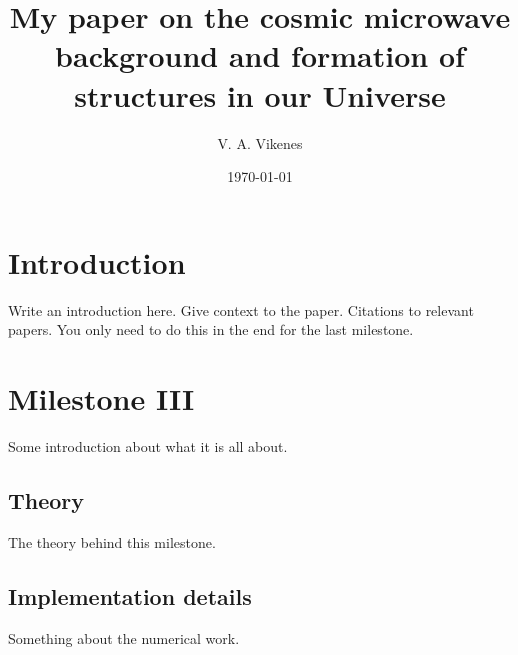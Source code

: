 \documentclass{aa}
\begin{document}
 

   \title{My paper on the cosmic microwave background and formation of structures in our Universe}

   \author{V. A. Vikenes}
 

   \date{\today}



   \maketitle

\section{Introduction}
Write an introduction here. Give context to the paper. Citations to relevant papers. You only need to do this in the end for the last milestone. %









\section{Milestone III}
Some introduction about what it is all about.

\subsection{Theory}
The theory behind this milestone.

\subsection{Implementation details}
Something about the numerical work.
\end{document}
